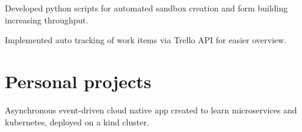 \documentclass[]{font}
\begin{document}
\begin{minipage}[t]{0.66\textwidth}
\begin{tightemize}
\item Developed python scripts for automated sandbox creation and form building increasing throughput. 
\item Implemented auto tracking of work items via Trello API for easier overview.
\end{tightemize}    
\sectionsep




\sectionsep



\section{Personal projects}

Asynchronous event-driven cloud native app created to learn microservices and kubernetes, deployed on a kind cluster.
\sectionsep


\end{minipage}
\end{document}
